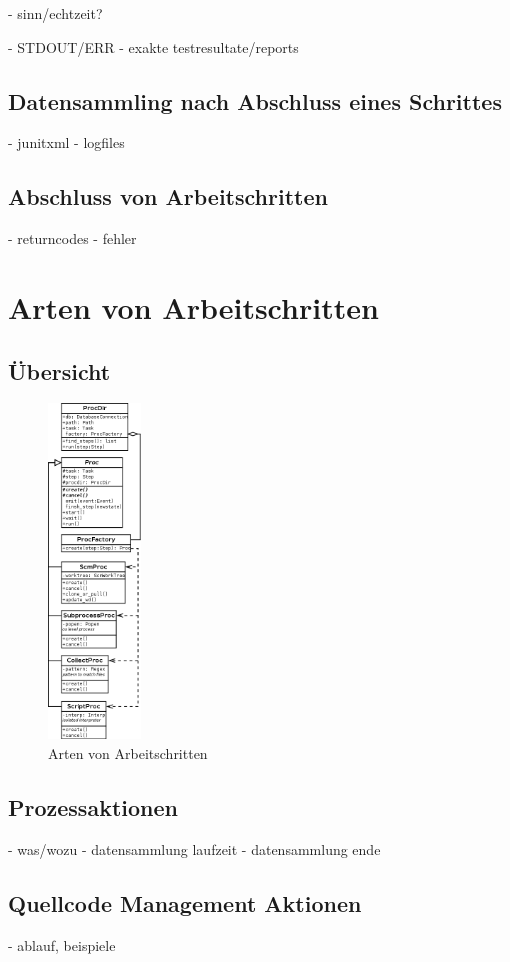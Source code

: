- sinn/echtzeit?

- STDOUT/ERR
- exakte testresultate/reports


\subsection{Datensammling nach Abschluss eines Schrittes}

- junitxml
- logfiles

\subsection{Abschluss von Arbeitschritten}

- returncodes
- fehler

\section{Arten von Arbeitschritten}

\subsection{\"Ubersicht}

\begin{figure}[ht] 
  \label{fig:klassen-arten-arbeitsschritt}
  \begin{center}
      \includegraphics[height=3.5in]{imageinput/klassen-arten-arbeitsschritt.png}
  \end{center}
  \caption{Arten von Arbeitschritten}
\end{figure}



\subsection{Prozessaktionen}


- was/wozu
- datensammlung laufzeit
- datensammlung ende

\subsection{Quellcode Management Aktionen}

- ablauf, beispiele
